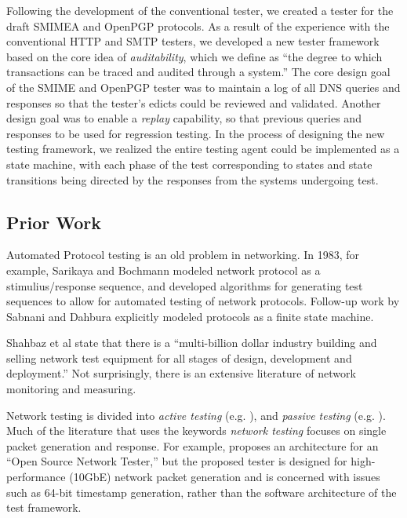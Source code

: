 \documentclass[preprint,3p]{elsarticle}
\begin{document}
Following the development of the conventional tester, we created a
tester for the draft SMIMEA and OpenPGP protocols. As a result of the
experience with the conventional HTTP and SMTP testers, we developed a
new tester framework based on the core idea of \emph{auditability},
which we define as ``the degree to which transactions can be traced
and audited through a system.'' The core design goal of the SMIME and
OpenPGP tester was to maintain a log of all DNS queries and responses
so that the tester's edicts could be reviewed and validated. Another
design goal was to enable a \emph{replay} capability, so that previous
queries and responses to be used for regression testing. In the
process of designing the new testing framework, we realized the entire
testing agent could be implemented as a state machine, with each phase
of the test corresponding to states and state transitions being
directed by the responses from the systems undergoing test.


\subsection{Prior Work}
Automated Protocol testing is an old problem in networking. In
1983, for example, Sarikaya and Bochmann modeled network protocol as a
stimulius/response sequence, and developed algorithms for generating
test sequences to allow for automated testing of network
protocols\cite{Sarikaya:1983:SIP:1024840.1035264,Sarikaya:1983:SIP:1035237.1035264}.
Follow-up work by Sabnani and Dahbura explicitly modeled protocols as
a finite state machine\cite{Sabnani:1985:NTG:319056.319003,Sabnani:1985:NTG:318951.319003}.

Shahbaz et al state that there is a
``multi-billion dollar industry building and selling network test
equipment for all stages of design, development and deployment.'' Not
surprisingly, there is an extensive literature of network monitoring and measuring. 

Network testing is divided into \emph{active testing}
(e.g. \cite{Medina:2004:MIT:1028788.1028835}), and \emph{passive
  testing} (e.g. \cite{Qian:2009:TRF:1644893.1644903}). Much of the
literature that uses the keywords \emph{network testing} focuses on
single packet generation and response. For example, \cite{Shahbaz:2013:AOS:2537857.2537880}
proposes an architecture for an ``Open Source Network Tester,'' but
the proposed tester is designed for high-performance (10GbE) network
packet generation and is concerned with issues such as 64-bit
timestamp generation, rather than the software architecture of the
test framework.
\end{document}
